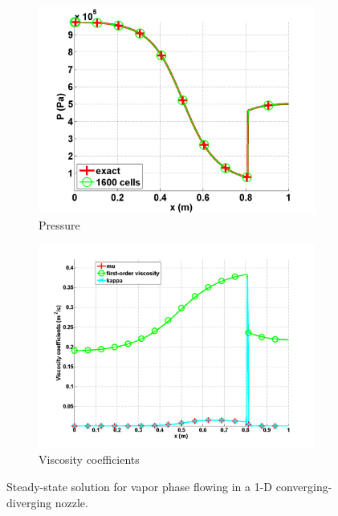 \begin{figure}[H]
        \begin{subfigure}[b]{0.495\textwidth}
                \centering
                \includegraphics[width=\textwidth]{figures/vapor_pressure_numerical_and_exact_1600.png}
                \caption{Pressure}
                \label{fig:1d_nozzle_vap_press}
        \end{subfigure}
        \begin{subfigure}[b]{0.495\textwidth}
                \centering
                \includegraphics[width=\textwidth]{figures/vapor_viscosity_numerical1600.png}
                \caption{Viscosity coefficients}
                \label{fig:1d_nozzle_vap_visc}
        \end{subfigure}
        \caption{Steady-state solution for vapor phase flowing in a 1-D converging-diverging nozzle.}
				\label{fig:1d_vap_nozzle}
\end{figure}

